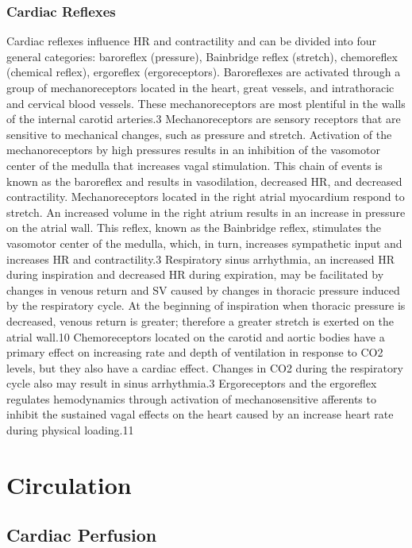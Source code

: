 \subsubsection{Cardiac Reflexes} 
Cardiac reflexes influence HR and contractility and can be divided into four general categories: baroreflex (pressure), Bainbridge reflex (stretch), chemoreflex (chemical reflex), ergoreflex (ergoreceptors). 
Baroreflexes are activated through a group of mechanoreceptors located in the heart, great vessels, and intrathoracic and cervical blood vessels. These mechanoreceptors are most plentiful in the walls of the internal carotid arteries.3 Mechanoreceptors are sensory receptors that are sensitive to mechanical changes, such as pressure and stretch. Activation of the mechanoreceptors by high pressures results in an inhibition of the vasomotor center of the medulla that increases vagal stimulation. This chain of events is known as the baroreflex and results in vasodilation, decreased HR, and decreased contractility.
Mechanoreceptors located in the right atrial myocardium respond to stretch. An increased volume in the right atrium results in an increase in pressure on the atrial wall. This reflex, known as the Bainbridge reflex, stimulates the vasomotor center of the medulla, which, in turn, increases sympathetic input and increases HR and contractility.3 Respiratory sinus arrhythmia, an increased HR during inspiration and decreased HR during expiration, may be facilitated by changes in venous return and SV caused by changes in thoracic pressure induced by the respiratory cycle. At the beginning of inspiration when thoracic pressure is decreased, venous return is greater; therefore a greater stretch is exerted on the atrial wall.10
Chemoreceptors located on the carotid and aortic bodies have a primary effect on increasing rate and depth of ventilation in response to CO2 levels, but they also have a cardiac effect. Changes in CO2 during the respiratory cycle also may result in sinus arrhythmia.3
Ergoreceptors and the ergoreflex regulates hemodynamics through activation of mechanosensitive afferents to inhibit the sustained vagal effects on the heart caused by an increase heart rate during physical loading.11


\section{Circulation}

\subsection{Cardiac Perfusion}

